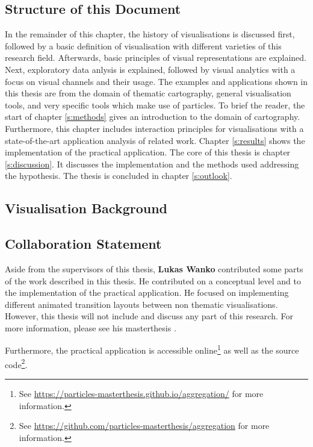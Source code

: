\subsection{Structure of this Document}
In the remainder of this chapter, the history of visualisations is discussed first, followed by a basic definition of visualisation with different varieties of this research field. Afterwards, basic principles of visual representations are explained. Next, exploratory data anlysis is explained, followed by visual analytics with a focus on visual channels and their usage.
The examples and applications shown in this thesis are from the domain of thematic cartography, general visualisation tools, and very specific tools which make use of particles. To brief the reader, the start of chapter \ref{s:methods} gives an introduction to the domain of cartography. Furthermore, this chapter includes interaction principles for visualisations with a state-of-the-art application analysis of related work. Chapter \ref{s:results} shows the implementation of the practical application. The core of this thesis is chapter \ref{s:discussion}. It discusses the implementation and the methods used addressing the hypothesis. The thesis is concluded in chapter \ref{s:outlook}.

\subsection{Visualisation Background}


\subsection{Collaboration Statement}
\label{s:collaboration-statement}
Aside from the supervisors of this thesis, \textbf{Lukas Wanko} contributed some parts of the work described in this thesis. He contributed on a conceptual level and to the implementation of the practical application. He focused on implementing different animated transition layouts between non thematic visualisations. However, this thesis will not include and discuss any part of this research. For more information, please see his masterthesis .

Furthermore, the practical application is accessible online\footnote{See \href{https://particles-masterthesis.github.io/aggregation/}{https://particles-masterthesis.github.io/aggregation/} for more information.} as well as the source code\footnote{See \href{https://github.com/particles-masterthesis/aggregation}{https://github.com/particles-masterthesis/aggregation} for more information.}.